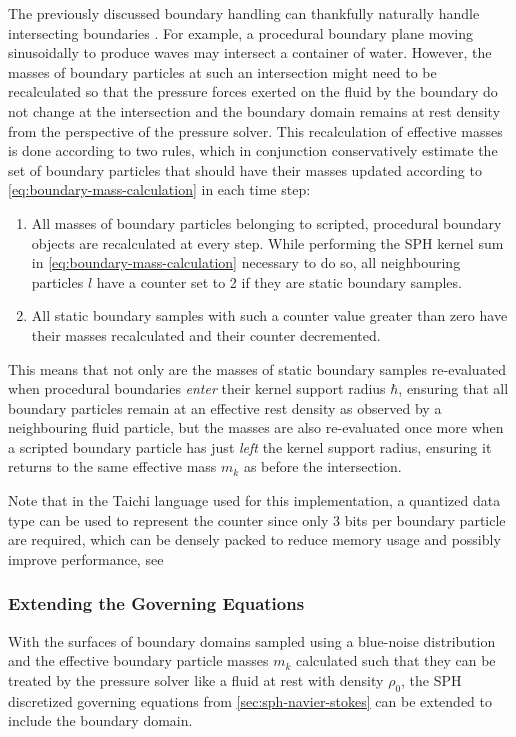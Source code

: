 \documentclass[oneside, a4paper]{book}
\begin{document}
    The previously discussed boundary handling can thankfully naturally handle intersecting boundaries \autocite{versatile-boundary-akinci}. For example, a procedural boundary plane moving sinusoidally to produce waves may intersect a container of water. However, the masses of boundary particles at such an intersection might need to be recalculated so that the pressure forces exerted on the fluid by the boundary do not change at the intersection and the boundary domain remains at rest density from the perspective of the pressure solver. This recalculation of effective masses is done according to two rules, which in conjunction conservatively estimate the set of boundary particles that should have their masses updated according to \autoref{eq:boundary-mass-calculation} in each time step:
    \begin{enumerate}
      \item All masses of boundary particles belonging to scripted, procedural boundary objects are recalculated at every step. While performing the SPH kernel sum in \autoref{eq:boundary-mass-calculation} necessary to do so, all neighbouring particles $l$ have a counter set to 2 if they are static boundary samples.
      \item All static boundary samples with such a counter value greater than zero have their masses recalculated and their counter decremented.
    \end{enumerate}
    This means that not only are the masses of static boundary samples re-evaluated when procedural boundaries \textit{enter} their kernel support radius $\hbar$, ensuring that all boundary particles remain at an effective rest density as observed by a neighbouring fluid particle, but the masses are also re-evaluated once more when a scripted boundary particle has just \textit{left} the kernel support radius, ensuring it returns to the same effective mass $m_k$ as before the intersection. 
    
    Note that in the Taichi language used for this implementation, a quantized data type can be used to represent the counter since only 3 bits per boundary particle are required, which can be densely packed to reduce memory usage and possibly improve performance, see \autocite[Hu et al.]{quantized-taichi}

    \subsubsection{Extending the Governing Equations}\label{subsub:bdy-extend-governing}
    With the surfaces of boundary domains sampled using a blue-noise distribution and the effective boundary particle masses $m_k$ calculated such that they can be treated by the pressure solver like a fluid at rest with density $\rho_0$, the SPH discretized governing equations from \autoref{sec:sph-navier-stokes} can be extended to include the boundary domain.
\end{document}

